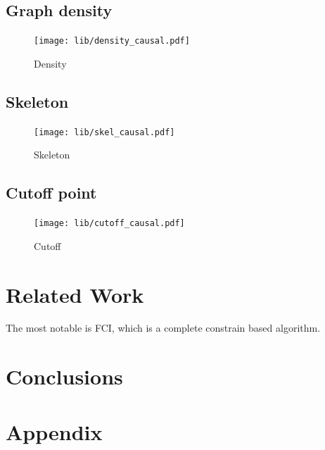\documentclass[11pt,a4paper]{report}
\begin{document}
\section{Graph density}
\begin{figure}[h]
  \centering
  \texttt{[image: lib/density\_causal.pdf]}
  \caption{Density}
  \label{density_causal}
\end{figure}

\section{Skeleton}
\begin{figure}
  \centering
  \texttt{[image: lib/skel\_causal.pdf]}
  \caption{Skeleton}
  \label{skel_causal}
\end{figure}

\section{Cutoff point}
\begin{figure}
  \centering
  \texttt{[image: lib/cutoff\_causal.pdf]}
  \caption{Cutoff}
  \label{cutoff_causal}
\end{figure}

\chapter{Related Work}\label{relatedwork}
The most notable is
FCI\cite{spirtesCausationPredictionSearch2000}, which is a complete
\cite{zhangCompletenessOrientationRules2008} constrain based algorithm.


\chapter{Conclusions}\label{conclusions}

\printbibliography

\appendix

\chapter{Appendix}\label{appendix}
\end{document}
